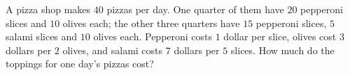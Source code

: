 A pizza shop makes $40$ pizzas per day. One quarter of them have $20$ pepperoni slices and $10$ olives each; the other three quarters have $15$ pepperoni slices, $5$ salami slices and $10$ olives each. Pepperoni costs $1$ dollar per slice, olives cost $3$ dollars per $2$ olives, and salami costs $7$ dollars per $5$ slices. How much do the toppings for one day's pizzas cost?
